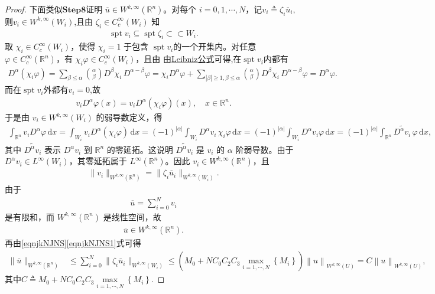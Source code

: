 \documentclass[../../main.tex]{subfiles}
\begin{document}
\begin{proof}
下面类似$\mathbf{Step8}$证明 $\overline{u}\in W^{k,\infty}(\mathbb{R}^n)$。对每个 $i=0,1,\cdots,N$，记$v_i\triangleq\zeta_i\overline{u}_i,$则$v_i\in W^{k,\infty}(W_i)$,且由 $\zeta_i\in C_c^\infty(W_i)$ 知
\begin{align*}
\operatorname{spt}v_i\subseteq\operatorname{spt}\zeta_i\subset\subset W_i.
\end{align*}
取 $\chi_i\in C_c^\infty(W_i)$，使得 $\chi_i=1$ 于包含 $\operatorname{spt}v_i$的一个开集内。对任意 $\varphi\in C_c^\infty(\mathbb{R}^n)$，有 $\chi_i\varphi\in C_c^\infty(W_i)$，且由 由\hyperref[theorem:ch05-弱导数性质]{Leibniz公式}可得,在$\operatorname{spt}v_i$内都有
\begin{align*}
D^{\alpha}(\chi _i\varphi )=\sum_{\beta \leqslant \alpha}{\binom{\alpha}{\beta}D^{\beta}\chi _i\,D^{\alpha -\beta}\varphi}=\chi _iD^{\alpha}\varphi +\sum_{|\beta |\geqslant 1,\beta \leqslant \alpha}{\binom{\alpha}{\beta}D^{\beta}\chi _i\,D^{\alpha -\beta}\varphi}=D^{\alpha}\varphi .
\end{align*}
而在$\operatorname{spt}v_i$外都有$v_i=0$,故
\begin{align*}
v_iD^\alpha\varphi(x)=v_iD^\alpha(\chi_i\varphi)(x),\quad x\in \mathbb{R}^n.
\end{align*}
于是由 $v_i\in W^{k,\infty}(W_i)$ 的弱导数定义，得
\begin{align*}
\int_{\mathbb{R}^n}v_iD^\alpha\varphi\,\mathrm{d}x
=\int_{W_i}v_iD^\alpha(\chi_i\varphi)\,\mathrm{d}x=(-1)^{|\alpha|}\int_{W_i}D^\alpha v_i\,\chi_i\varphi\,\mathrm{d}x=(-1)^{|\alpha|}\int_{W_i}D^\alpha v_i\varphi\,\mathrm{d}x=(-1)^{|\alpha|}\int_{\mathbb{R}^n}\widetilde{D^\alpha v_i}\,\varphi\,\mathrm{d}x,
\end{align*}
其中 $\widetilde{D^\alpha v_i}$ 表示 $D^\alpha v_i$ 到 $\mathbb{R}^n$ 的零延拓。这说明 $\widetilde{D^\alpha v_i}$ 是 $v_i$ 的 $\alpha$ 阶弱导数。由于 $D^\alpha v_i\in L^\infty(W_i)$，其零延拓属于 $L^\infty(\mathbb{R}^n)$。因此 $v_i\in W^{k,\infty}(\mathbb{R}^n)$，且
\begin{align*}
\|v_i\|_{W^{k,\infty}(\mathbb{R}^n)}=\|\zeta_i\overline{u}_i\|_{W^{k,\infty}(W_i)}.
\end{align*}
由于
\begin{align*}
\overline{u}=\sum\limits_{i=0}^{N}v_i
\end{align*}
是有限和，而 $W^{k,\infty}(\mathbb{R}^n)$ 是线性空间，故
\begin{align*}
\overline{u}\in W^{k,\infty}(\mathbb{R}^n).
\end{align*}
再由\eqref{eqnjkNJNS}\eqref{eqnjkNJNS1}式可得
\begin{align}
\|\overline{u}\|_{W^{k,\infty}(\mathbb{R}^{n})}
&\leqslant\sum_{i=0}^{N}\|\zeta_i\overline{u}_i\|_{W^{k,\infty}(W_i)}
\leqslant \left( M_0+NC_0C_2C_3\underset{i=1,\cdots ,N}{\max}\left\{ M_i \right\} \right) \left\| u \right\| _{W^{k,\infty}\left( U \right)}=C\left\| u \right\| _{W^{k,\infty}\left( U \right)},\label{HJKNAJAAAA}
\end{align}
其中$C\triangleq M_0+NC_0C_2C_3\underset{i=1,\cdots ,N}{\max}\left\{ M_i \right\}$.


\end{proof}
\end{document}
